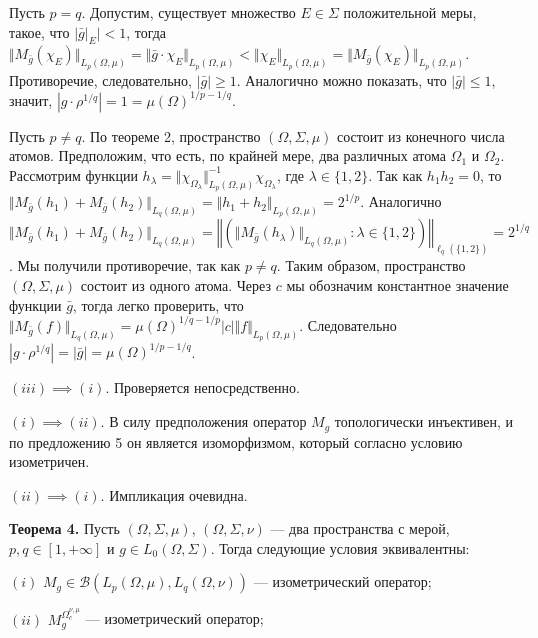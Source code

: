 \documentclass[11pt,twoside]{article}
\begin{document}
        Пусть $p=q$. Допустим, существует множество $E\in\Sigma$ положительной
        меры, такое, что $|\bar{g}|_E|<1$, тогда $\Vert
    M_{\bar{g}}(\chi_E)\Vert_{L_p(\Omega,\mu)} =\Vert
    \bar{g}\cdot\chi_E\Vert_{L_p(\Omega,\mu)}
    <\Vert\chi_E\Vert_{L_p(\Omega,\mu)} =\Vert
    M_{\bar{g}}(\chi_E)\Vert_{L_p(\Omega,\mu)}$. Противоречие,
        следовательно, $|\bar{g}|\geq 1$. Аналогично можно показать, что
    $|\bar{g}|\leq 1$, значит,
    $|g\cdot\rho^{1/q}|=1={\mu(\Omega)}^{1/p-1/q}$.

        Пусть $p\neq q$. По теореме 2, пространство $(\Omega,\Sigma,\mu)$
        состоит из конечного числа атомов. Предположим, что есть, по крайней
        мере, два различных атома $\Omega_1$ и $\Omega_2$. Рассмотрим функции
    $h_\lambda
    =\Vert\chi_{\Omega_\lambda}\Vert_{L_p(\Omega,\mu)}^{-1}
    \chi_{\Omega_\lambda}$,
        где $\lambda\in \{1,2 \}$. Так как $h_1h_2=0$, то $ \Vert
    M_{\bar{g}}(h_1)+M_{\bar{g}}(h_2)\Vert_{L_q(\Omega,\mu)} =\Vert
    h_1+h_2\Vert_{L_p(\Omega,\mu)} =2^{1/p}$. Аналогично $ \Vert
    M_{\bar{g}}(h_1)+M_{\bar{g}}(h_2)\Vert_{L_q(\Omega,\mu)}
    =\left\Vert\left(\Vert
    M_{\bar{g}}(h_\lambda)\Vert_{L_q(\Omega,\mu)}:\lambda\in \{1,2 \}\right)
    \right\Vert_{\ell_q(\{1,2\})} =2^{1/q}$. Мы получили противоречие, так
        как $p\neq q$. Таким образом, пространство $(\Omega,\Sigma,\mu)$ состоит
        из одного атома. Через $c$ мы обозначим константное значение функции
    $\bar{g}$, тогда легко проверить, что $\Vert
    M_{\bar{g}}(f)\Vert_{L_q(\Omega,\mu)}={\mu(\Omega)}^{1/q-1/p}|c|\Vert
    f\Vert_{L_p(\Omega,\mu)}$. Следовательно
    $|g\cdot\rho^{1/q}|=|\bar{g}|={\mu(\Omega)}^{1/p-1/q}$.

    $(iii)$$\implies$$ (i)$. Проверяется непосредственно.

    $(i)$$\implies$$ (ii)$. В силу предположения оператор $M_g$ топологически
        инъективен, и по предложению 5 он является изоморфизмом, который
        согласно условию изометричен.

    $(ii)$$\implies$$ (i)$. Импликация очевидна.


        \textbf{Теорема 4.} Пусть $(\Omega,\Sigma,\mu)$, $(\Omega,\Sigma,\nu)$
        --- два пространства с мерой, $p,q\in[1,+\infty]$ и $g\in
    L_0(\Omega,\Sigma)$. Тогда следующие условия эквивалентны:

    $(i)$ $M_g\in\mathcal{B}(L_p(\Omega,\mu),L_q(\Omega,\nu))$ ---
        изометрический оператор;

    $(ii)$ $M_g^{\Omega_c^{\nu,\mu}}$ --- изометрический оператор;
\end{document}
